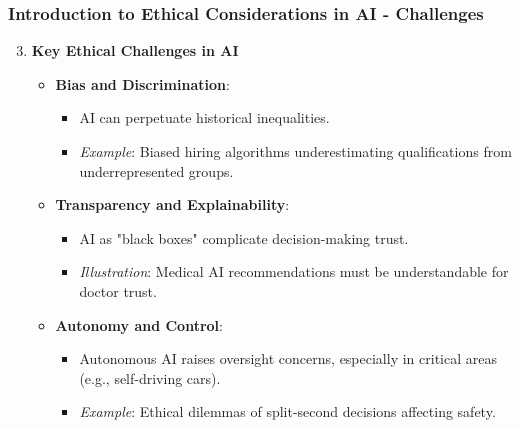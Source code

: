 \documentclass[aspectratio=169]{beamer}
\begin{document}
\begin{frame}[fragile]
    \frametitle{Introduction to Ethical Considerations in AI - Challenges}
    \begin{enumerate}
        \setcounter{enumi}{2}
        \item \textbf{Key Ethical Challenges in AI}
        \begin{itemize}
            \item \textbf{Bias and Discrimination}:
            \begin{itemize}
                \item AI can perpetuate historical inequalities.
                \item \textit{Example}: Biased hiring algorithms underestimating qualifications from underrepresented groups.
            \end{itemize}
            
            \item \textbf{Transparency and Explainability}:
            \begin{itemize}
                \item AI as "black boxes" complicate decision-making trust.
                \item \textit{Illustration}: Medical AI recommendations must be understandable for doctor trust.
            \end{itemize}
            
            \item \textbf{Autonomy and Control}:
            \begin{itemize}
                \item Autonomous AI raises oversight concerns, especially in critical areas (e.g., self-driving cars).
                \item \textit{Example}: Ethical dilemmas of split-second decisions affecting safety.
            \end{itemize}
        \end{itemize}
    \end{enumerate}
\end{frame}
\end{document}
